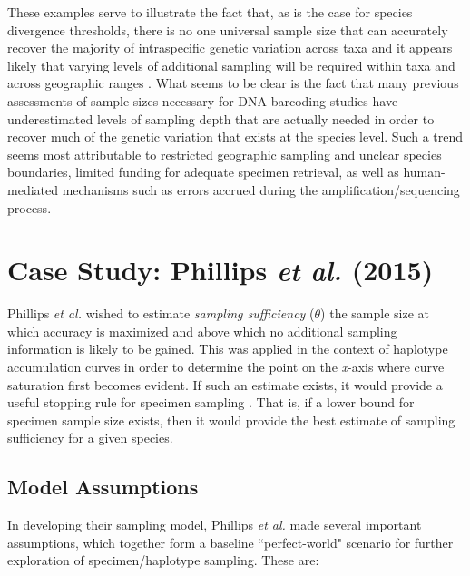 These examples serve to illustrate the fact that, as is the case for species divergence thresholds, there is no one universal sample size that can accurately recover the majority of intraspecific genetic variation across taxa and it appears likely that varying levels of additional sampling will be required within taxa and across geographic ranges \cite{lou2012effect}. What seems to be clear is the fact that many previous assessments of sample sizes necessary for DNA barcoding studies have underestimated levels of sampling depth that are actually needed in order to recover much of the genetic variation that exists at the species level. Such a trend seems most attributable to restricted geographic sampling and unclear species boundaries, limited funding for adequate specimen retrieval, as well as human-mediated mechanisms such as errors accrued during the amplification/sequencing process. 



\section{Case Study: Phillips \textit{et al.} (2015)}

Phillips \textit{et al.} \cite{phillips2015exploration} wished to estimate \textit{sampling sufficiency} ($\theta$) \textemdash \hspace{1mm} the sample size at which accuracy is maximized and above which no additional sampling information is likely to be gained. This was applied in the context of haplotype accumulation curves in order to determine the point on the \textit{x}-axis where curve saturation first becomes evident. If such an estimate exists, it would provide a useful stopping rule for specimen sampling \cite{phillips2015exploration}. That is, if a lower bound for specimen sample size exists, then it would provide the best estimate of sampling sufficiency for a given species.



\subsection{Model Assumptions}

In developing their sampling model, Phillips \textit{et al.} \cite{phillips2015exploration} made several important \\ assumptions, which together form a baseline ``perfect-world" scenario for further \\ exploration of specimen/haplotype sampling. These are:


